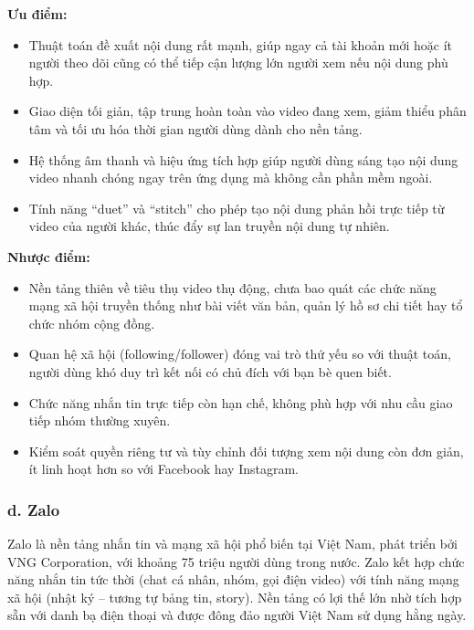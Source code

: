\documentclass[../DoAn.tex]{subfiles}
\begin{document}
\noindent\textbf{Ưu điểm:}
\begin{itemize}
    \item Thuật toán đề xuất nội dung rất mạnh, giúp ngay cả tài khoản mới hoặc ít người theo dõi cũng có thể tiếp cận lượng lớn người xem nếu nội dung phù hợp.
    \item Giao diện tối giản, tập trung hoàn toàn vào video đang xem, giảm thiểu phân tâm và tối ưu hóa thời gian người dùng dành cho nền tảng.
    \item Hệ thống âm thanh và hiệu ứng tích hợp giúp người dùng sáng tạo nội dung video nhanh chóng ngay trên ứng dụng mà không cần phần mềm ngoài.
    \item Tính năng ``duet'' và ``stitch'' cho phép tạo nội dung phản hồi trực tiếp từ video của người khác, thúc đẩy sự lan truyền nội dung tự nhiên.
\end{itemize}

\noindent\textbf{Nhược điểm:}
\begin{itemize}
    \item Nền tảng thiên về tiêu thụ video thụ động, chưa bao quát các chức năng mạng xã hội truyền thống như bài viết văn bản, quản lý hồ sơ chi tiết hay tổ chức nhóm cộng đồng.
    \item Quan hệ xã hội (following/follower) đóng vai trò thứ yếu so với thuật toán, người dùng khó duy trì kết nối có chủ đích với bạn bè quen biết.
    \item Chức năng nhắn tin trực tiếp còn hạn chế, không phù hợp với nhu cầu giao tiếp nhóm thường xuyên.
    \item Kiểm soát quyền riêng tư và tùy chỉnh đối tượng xem nội dung còn đơn giản, ít linh hoạt hơn so với Facebook hay Instagram.
\end{itemize}

\subsubsection*{d. Zalo}
Zalo là nền tảng nhắn tin và mạng xã hội phổ biến tại Việt Nam, phát triển bởi VNG Corporation, với khoảng 75 triệu người dùng trong nước. Zalo kết hợp chức năng nhắn tin tức thời (chat cá nhân, nhóm, gọi điện video) với tính năng mạng xã hội (nhật ký -- tương tự bảng tin, story). Nền tảng có lợi thế lớn nhờ tích hợp sẵn với danh bạ điện thoại và được đông đảo người Việt Nam sử dụng hằng ngày.
\end{document}
